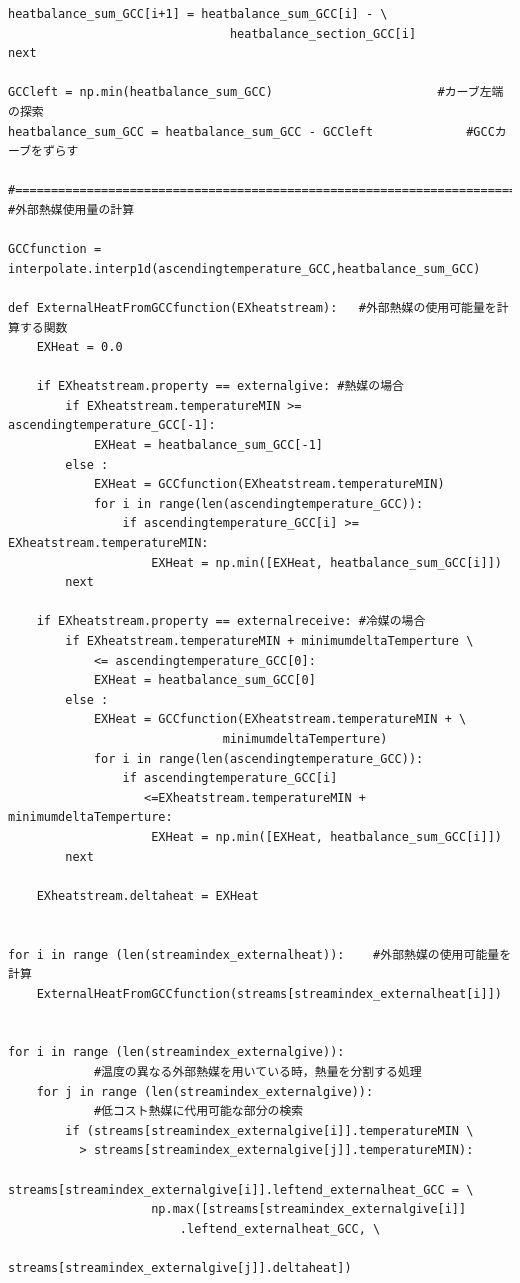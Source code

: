 \documentclass[a4j]{jsreport}
\begin{document}
\begin{lstlisting}[caption=グランドコンポジットカーブおよびTQ線図を書くコード]
    heatbalance_sum_GCC[i+1] = heatbalance_sum_GCC[i] - \
                               heatbalance_section_GCC[i]
next

GCCleft = np.min(heatbalance_sum_GCC)                       #カーブ左端の探索
heatbalance_sum_GCC = heatbalance_sum_GCC - GCCleft             #GCCカーブをずらす

#==============================================================================
#外部熱媒使用量の計算

GCCfunction = interpolate.interp1d(ascendingtemperature_GCC,heatbalance_sum_GCC)

def ExternalHeatFromGCCfunction(EXheatstream):   #外部熱媒の使用可能量を計算する関数
    EXHeat = 0.0

    if EXheatstream.property == externalgive: #熱媒の場合
        if EXheatstream.temperatureMIN >= ascendingtemperature_GCC[-1]:
            EXHeat = heatbalance_sum_GCC[-1]
        else :
            EXHeat = GCCfunction(EXheatstream.temperatureMIN)
            for i in range(len(ascendingtemperature_GCC)):
                if ascendingtemperature_GCC[i] >= EXheatstream.temperatureMIN:
                    EXHeat = np.min([EXHeat, heatbalance_sum_GCC[i]])
        next

    if EXheatstream.property == externalreceive: #冷媒の場合
        if EXheatstream.temperatureMIN + minimumdeltaTemperture \
            <= ascendingtemperature_GCC[0]:
            EXHeat = heatbalance_sum_GCC[0]
        else :
            EXHeat = GCCfunction(EXheatstream.temperatureMIN + \
                              minimumdeltaTemperture)
            for i in range(len(ascendingtemperature_GCC)):
                if ascendingtemperature_GCC[i]
                   <=EXheatstream.temperatureMIN + minimumdeltaTemperture:
                    EXHeat = np.min([EXHeat, heatbalance_sum_GCC[i]])
        next

    EXheatstream.deltaheat = EXHeat


for i in range (len(streamindex_externalheat)):    #外部熱媒の使用可能量を計算
    ExternalHeatFromGCCfunction(streams[streamindex_externalheat[i]])


for i in range (len(streamindex_externalgive)):
            #温度の異なる外部熱媒を用いている時，熱量を分割する処理
    for j in range (len(streamindex_externalgive)):
            #低コスト熱媒に代用可能な部分の検索
        if (streams[streamindex_externalgive[i]].temperatureMIN \
          > streams[streamindex_externalgive[j]].temperatureMIN):
               streams[streamindex_externalgive[i]].leftend_externalheat_GCC = \
                    np.max([streams[streamindex_externalgive[i]]
                        .leftend_externalheat_GCC, \
                        streams[streamindex_externalgive[j]].deltaheat])



\end{lstlisting}
\end{document}
